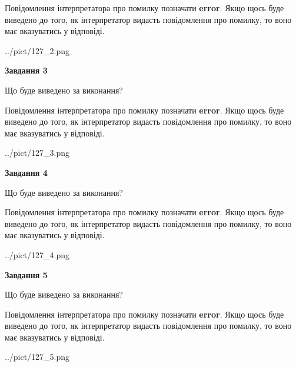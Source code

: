 \documentclass[12pt, ukrainian]{article}
\begin{document}
{\begin {large}
Повідомлення інтерпретатора про помилку позначати \textbf{error}.
Якщо щось буде виведено до того, як інтерпретатор видасть повідомлення про помилку, 
то воно має вказуватись у відповіді. \par


\begin{center}
	{../pict/127_2.png}
\end{center}
\newpage

{\begin {center}\textbf{Завдання 3}\end {center}}\par
Що буде виведено за виконання?

Повідомлення інтерпретатора про помилку позначати \textbf{error}.
Якщо щось буде виведено до того, як інтерпретатор видасть повідомлення про помилку, 
то воно має вказуватись у відповіді. \par


\begin{center}
	{../pict/127_3.png}
\end{center}
\newpage

{\begin {center}\textbf{Завдання 4}\end {center}}\par
Що буде виведено за виконання?

Повідомлення інтерпретатора про помилку позначати \textbf{error}.
Якщо щось буде виведено до того, як інтерпретатор видасть повідомлення про помилку, 
то воно має вказуватись у відповіді. \par


\begin{center}
	{../pict/127_4.png}
\end{center}
\newpage

{\begin {center}\textbf{Завдання 5}\end {center}}\par
Що буде виведено за виконання?

Повідомлення інтерпретатора про помилку позначати \textbf{error}.
Якщо щось буде виведено до того, як інтерпретатор видасть повідомлення про помилку, 
то воно має вказуватись у відповіді. \par


\begin{center}
	{../pict/127_5.png}
\end{center}
\newpage


\end{large}}
\end{document}
